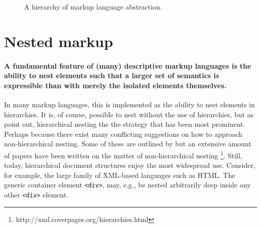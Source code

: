 \documentclass{scrreprt}
\begin{document}
\begin{figure}[h]
\centering


\caption{A hierarchy of markup language abstraction.}
\label{fig:markup-types-hierarchy}
\end{figure}













\section{Nested markup}
\label{sec:nesting}
\paragraph{A fundamental feature of (many) descriptive markup languages is the ability to nest elements such that a larger set of semantics is expressible than with merely the isolated elements themselves.} In many markup languages, this is implemented as the ability to nest elements in hierarchies. It is, of course, possible to nest without the use of hierarchies, but as \citet*{durand} point out, hierarchical nesting the the strategy that has been most prominent. Perhaps because there exist many conflicting suggestions on how to approach non-hierarchical nesting. Some of these are outlined by \citet{durand} but an extensive amount of papers have been written on the matter of non-hierarchical nesting \footnote{http://xml.coverpages.org/hierarchies.html}. Still, today, hierarchical document structures enjoy the most widespread use. Consider, for example, the large family of XML-based languages such as HTML. The generic container element \texttt{<div>}, may, e.g., be nested arbitrarily deep inside any other \texttt{<div>} element.
\end{document}
